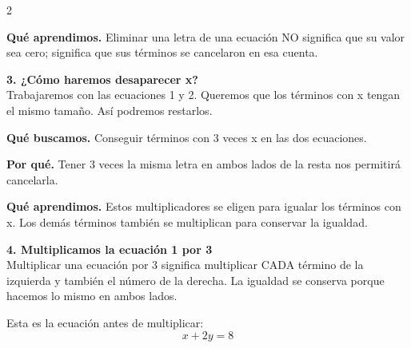 \documentclass[11pt,a4paper,landscape]{article}
\begin{document}
\begin{multicols*}{2}
\begin{minipage}{\linewidth}
\par\smallskip\textbf{Qué aprendimos.} Eliminar una letra de una ecuación NO significa que su valor sea cero; significa que sus términos se cancelaron en esa cuenta.
\end{minipage}\par\medskip
\noindent\begin{minipage}{\linewidth}\textbf{3. ¿Cómo haremos desaparecer x?}\\[2pt]Trabajaremos con las ecuaciones 1 y 2. Queremos que los términos con x tengan el mismo tamaño. Así podremos restarlos.
\par\smallskip\textbf{Qué buscamos.} Conseguir términos con 3 veces x en las dos ecuaciones.
\par\smallskip\textbf{Por qué.} Tener 3 veces la misma letra en ambos lados de la resta nos permitirá cancelarla.
\par{}\par\smallskip
\par\smallskip\textbf{Qué aprendimos.} Estos multiplicadores se eligen para igualar los términos con x. Los demás términos también se multiplican para conservar la igualdad.
\end{minipage}\par\medskip
\noindent\begin{minipage}{\linewidth}\textbf{4. Multiplicamos la ecuación 1 por 3}\\[2pt]Multiplicar una ecuación por 3 significa multiplicar CADA término de la izquierda y también el número de la derecha. La igualdad se conserva porque hacemos lo mismo en ambos lados.
\par\smallskip Esta es la ecuación antes de multiplicar:
\[x + 2y = 8\]
\par{}\par\smallskip

\end{minipage}
\end{multicols*}
\end{document}
